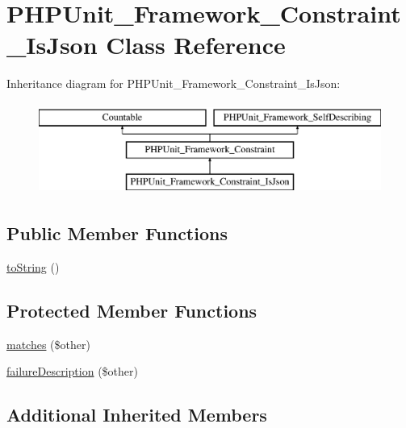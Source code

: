 \hypertarget{class_p_h_p_unit___framework___constraint___is_json}{}\section{P\+H\+P\+Unit\+\_\+\+Framework\+\_\+\+Constraint\+\_\+\+Is\+Json Class Reference}
\label{class_p_h_p_unit___framework___constraint___is_json}
Inheritance diagram for P\+H\+P\+Unit\+\_\+\+Framework\+\_\+\+Constraint\+\_\+\+Is\+Json\+:\begin{figure}[H]
\begin{center}
\leavevmode
\includegraphics[height=3.000000cm]{class_p_h_p_unit___framework___constraint___is_json}
\end{center}
\end{figure}
\subsection*{Public Member Functions}
\begin{DoxyCompactItemize}
\item 
\mbox{\hyperlink{class_p_h_p_unit___framework___constraint___is_json_a5558c5d549f41597377fa1ea8a1cefa3}{to\+String}} ()
\end{DoxyCompactItemize}
\subsection*{Protected Member Functions}
\begin{DoxyCompactItemize}
\item 
\mbox{\hyperlink{class_p_h_p_unit___framework___constraint___is_json_a9c9c337de483bbdbb9fa249a6c7c9cc5}{matches}} (\$other)
\item 
\mbox{\hyperlink{class_p_h_p_unit___framework___constraint___is_json_aaabb679273bfb812df4d81c283754a59}{failure\+Description}} (\$other)
\end{DoxyCompactItemize}
\subsection*{Additional Inherited Members}


